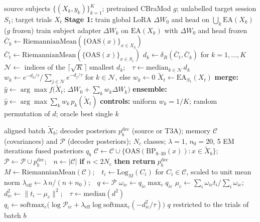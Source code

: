 \documentclass[preprint,12pt]{elsarticle}
\newcommand{\rev}[1]{#1}
\begin{document}
\begin{algorithm}[!htbp]
\caption{GeoRoute: covariance-distance routing of subject adapters}
\label{alg:georoute}
\begin{algorithmic}[1]
\Require source subjects $\{(X_k,y_k)\}_{k=1}^K$; pretrained CBraMod $g$; unlabelled target session $S_1$; target trials $X_t$
\State \textbf{Stage 1:} train global LoRA $\Delta W_0$ and head on $\bigcup_k \mathrm{EA}(X_k)$ ($g$ frozen)
 
  \State train subject adapter $\Delta W_k$ on $\mathrm{EA}(X_k)$ with $\Delta W_0$ and head frozen
  \State $\bar C_k \gets \mathrm{RiemannianMean}(\{\mathrm{OAS}(x)\}_{x\in X_k})$
\EndFor
\State $\bar C_t \gets \mathrm{RiemannianMean}(\{\mathrm{OAS}(x)\}_{x\in S_1})$
\State $d_k \gets \delta_R(\bar C_t,\bar C_k)$ for $k=1,\dots,K$ 
\State $\mathcal{N} \gets$ indices of the $\lceil\sqrt K\rceil$ smallest $d_k$;\ \ $\tau \gets \mathrm{median}_{k\in\mathcal N}\, d_k$
\State $w_k \gets e^{-d_k/\tau}\big/\sum_{j\in\mathcal N}e^{-d_j/\tau}$ for $k\in\mathcal N$, else $w_k\gets 0$
\State $\tilde X_t \gets \mathrm{EA}_{S_1}(X_t)$ 
\State \textbf{merge:} $\hat y \gets \arg\max f\big(\tilde X_t;\,\Delta W_0+\textstyle\sum_k w_k\Delta W_k\big)$
\State \textbf{ensemble:} $\hat y \gets \arg\max \textstyle\sum_k w_k\, p_k(\tilde X_t)$
\State \textbf{controls:} uniform $w_k=1/K$; random permutation of $d$; oracle best single $k$
\end{algorithmic}
\end{algorithm}

\begin{algorithm}[!htbp]
\caption{RCTTA: Riemannian co-training at test time (one online step)}
\label{alg:rctta}
\begin{algorithmic}[1]
\Require aligned batch $\tilde X_b$; decoder posteriors $p^{\mathrm{dec}}_b$ (source or T3A); memory $\mathcal{C}$ (covariances) and $\mathcal{P}$ (decoder posteriors); $N_c$ classes; $\lambda=1$, $n_0=20$, 5 EM iterations
\Ensure fused posteriors $q_b$
\State $\mathcal{C} \gets \mathcal{C}\cup\{\mathrm{OAS}(\mathrm{BP}_{8\text{--}30}(x)) : x\in\tilde X_b\}$;\ \ $\mathcal P \gets \mathcal P \cup p^{\mathrm{dec}}_b$;\ \ $n\gets|\mathcal C|$
\State \textbf{if} $n < 2N_c$ \textbf{then return} $p^{\mathrm{dec}}_b$
\State $M \gets \mathrm{RiemannianMean}(\mathcal C)$;\ \ $t_i \gets \mathrm{Log}_M(C_i)$ for $C_i\in\mathcal C$, scaled to unit mean norm
\State $\lambda_{\mathrm{eff}} \gets \lambda\, n/(n+n_0)$;\ \ $q \gets \mathcal P$
 
  \State $\omega_{ic} \gets q_{ic}\max_c q_{ic}$ 
  \State $\mu_c \gets \sum_i \omega_{ic} t_i / \sum_i \omega_{ic}$;\ \ $d^2_{ic}\gets\lVert t_i-\mu_c\rVert^2$;\ \ $\tau\gets\mathrm{median}(d^2)$
  \State $q_i \gets \mathrm{softmax}_c\big(\log \mathcal P_{ic} + \lambda_{\mathrm{eff}} \log \mathrm{softmax}_c(-d^2_{ic}/\tau)\big)$
\EndFor
\State \Return $q$ restricted to the trials of batch $b$ \Comment{\rev{includes the current batch}}
\end{algorithmic}
\end{algorithm}
\end{document}
